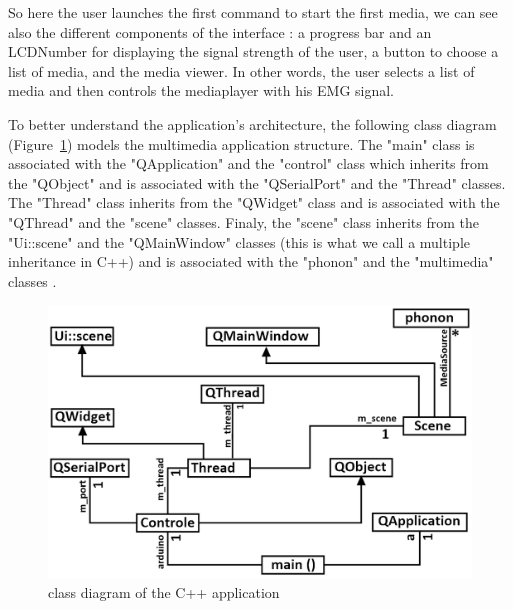\documentclass[conference]{IEEEtran}
\begin{document}
So here the user launches the first command to start the first media, we can see also the different components of the interface : a progress bar and an LCDNumber for displaying the signal strength of the user, a button to choose a list of media, and the media viewer. In other words, the user selects a list of media and then controls the mediaplayer with his EMG signal.
\par
To better understand the application's architecture, the following class diagram (Figure~\ref{fig:diagram}) models the multimedia application structure. The "main" class is associated with the "QApplication" and the "control" class which inherits from the "QObject" and is associated with the "QSerialPort" and the "Thread" classes. The "Thread" class inherits from the "QWidget" class and is associated with the "QThread" and the "scene" classes. Finaly, the "scene" class inherits from the "Ui::scene" and the "QMainWindow" classes (this is what we call a multiple inheritance in C++) and is associated with the "phonon" and the "multimedia" classes .

\begin{figure}[!hb]
    \includegraphics[scale=0.30]{app3.png}
    \caption{class diagram of the C++ application}
    \label{fig:diagram}
\end{figure}
\end{document}

